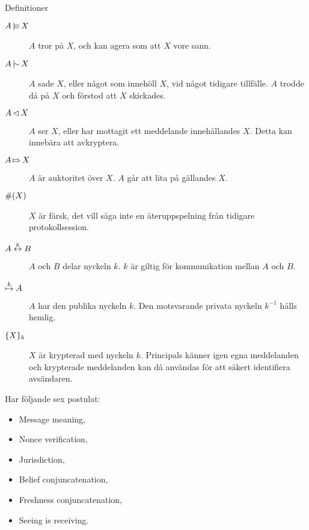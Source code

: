 \begin{frame}[allowframebreaks]{Definitioner}
  \begin{description}
    \item[\(A\operatorname{|\!\!\!\equiv} X\)] \(A\) tror på \(X\), och kan agera som att \(X\) 
      vore sann.
    \item[\(A\operatorname{|\!\!\!\sim} X\)] \(A\) sade \(X\), eller något som innehöll \(X\), vid 
      något tidigare tillfälle.
      \(A\) trodde då på \(X\) och förstod att \(X\) skickades.
    \item[\(A\operatorname{\lhd} X\)] \(A\) ser \(X\), eller har mottagit ett meddelande 
      innehållandes \(X\).
      Detta kan innebära att avkryptera.
    \item[\(A\operatorname{\Mapsto} X\)] \(A\) är auktoritet över \(X\).
      \(A\) går att lita på gällandes \(X\).
    \item[\(\#(X)\)] \(X\) är färsk, det vill säga inte en återuppspelning 
      från tidigare protokollsession.
%
    \item[\(A\stackrel{k}{\leftrightarrow} B\)] \(A\) och \(B\) delar nyckeln \(k\).
      \(k\) är giltig för kommunikation mellan \(A\) och \(B\).
    \item[\(\stackrel{k}{\mapsto} A\)] \(A\) har den publika nyckeln \(k\).
      Den motsvarande privata nyckeln \(k^{-1}\) hålls hemlig.
    \item[\(\{X\}_{k}\)] \(X\) är krypterad med nyckeln \(k\).
      Principals känner igen egna meddelanden och krypterade meddelanden kan då 
      användas för att säkert identifiera avsändaren.
  \end{description}
\end{frame}

\begin{frame}
  Har följande sex postulat:
  \begin{itemize}
    \item Message meaning,
    \item Nonce verification,
    \item Jurisdiction,
    \item Belief conjuncatenation,
    \item Freshness conjuncatenation,
    \item Seeing is receiving.
  \end{itemize}
\end{frame}

